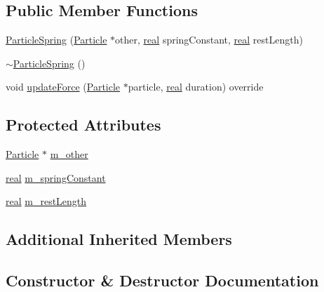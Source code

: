 \subsection*{Public Member Functions}
\begin{DoxyCompactItemize}
\item 
\mbox{\hyperlink{classrum_1_1_particle_spring_af66a4191e6d0e567d0f88cc60f398c63}{Particle\+Spring}} (\mbox{\hyperlink{classrum_1_1_particle}{Particle}} $\ast$other, \mbox{\hyperlink{namespacerum_a7e8cca23573d5eaead0f138cbaa4862c}{real}} spring\+Constant, \mbox{\hyperlink{namespacerum_a7e8cca23573d5eaead0f138cbaa4862c}{real}} rest\+Length)
\item 
\mbox{\hyperlink{classrum_1_1_particle_spring_ac48ba65487b023ea754b4e0e8a33dafc}{$\sim$\+Particle\+Spring}} ()
\item 
void \mbox{\hyperlink{classrum_1_1_particle_spring_acd45c3481f7e7d43978429c7e3e8c660}{update\+Force}} (\mbox{\hyperlink{classrum_1_1_particle}{Particle}} $\ast$particle, \mbox{\hyperlink{namespacerum_a7e8cca23573d5eaead0f138cbaa4862c}{real}} duration) override
\end{DoxyCompactItemize}
\subsection*{Protected Attributes}
\begin{DoxyCompactItemize}
\item 
\mbox{\hyperlink{classrum_1_1_particle}{Particle}} $\ast$ \mbox{\hyperlink{classrum_1_1_particle_spring_aa09612b88d608ed80225c05baddfc0a3}{m\+\_\+other}}
\item 
\mbox{\hyperlink{namespacerum_a7e8cca23573d5eaead0f138cbaa4862c}{real}} \mbox{\hyperlink{classrum_1_1_particle_spring_ab799a061ff48edc65244d2df25a443ee}{m\+\_\+spring\+Constant}}
\item 
\mbox{\hyperlink{namespacerum_a7e8cca23573d5eaead0f138cbaa4862c}{real}} \mbox{\hyperlink{classrum_1_1_particle_spring_a4e126e603b40716ece3ef38108290dae}{m\+\_\+rest\+Length}}
\end{DoxyCompactItemize}
\subsection*{Additional Inherited Members}


\subsection{Constructor \& Destructor Documentation}
\mbox{\label{classrum_1_1_particle_spring_af66a4191e6d0e567d0f88cc60f398c63}} 

